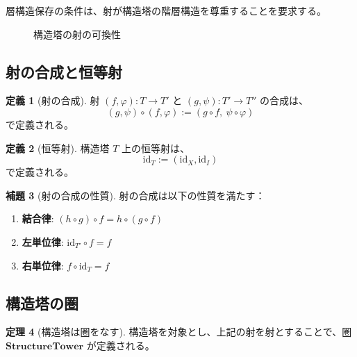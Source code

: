 \documentclass[a4paper,12pt]{ltjsarticle}
\theoremstyle{definition}
\newtheorem{definition}{定義}[section]
\newtheorem{theorem}[definition]{定理}
\newtheorem{lemma}[definition]{補題}
\begin{document}
層構造保存の条件は、射が構造塔の階層構造を尊重することを要求する。

\begin{figure}[h]
\centering
{}
\caption{構造塔の射の可換性}
\label{fig:morphism-commute}
\end{figure}

\subsection{射の合成と恒等射}

\begin{definition}[射の合成]
\label{def:morphism-composition}
射 $(f, \varphi): T \to T'$ と $(g, \psi): T' \to T''$ の合成は、
\[
(g, \psi) \circ (f, \varphi) := (g \circ f,\ \psi \circ \varphi)
\]
で定義される。
\end{definition}

\begin{definition}[恒等射]
構造塔 $T$ 上の恒等射は、
\[
\mathrm{id}_T := (\mathrm{id}_X, \mathrm{id}_I)
\]
で定義される。
\end{definition}

\begin{lemma}[射の合成の性質]
射の合成は以下の性質を満たす：
\begin{enumerate}
\item \textbf{結合律}: $(h \circ g) \circ f = h \circ (g \circ f)$
\item \textbf{左単位律}: $\mathrm{id}_{T'} \circ f = f$
\item \textbf{右単位律}: $f \circ \mathrm{id}_T = f$
\end{enumerate}
\end{lemma}

\subsection{構造塔の圏}

\begin{theorem}[構造塔は圏をなす]
\label{thm:tower-category}
構造塔を対象とし、上記の射を射とすることで、圏 $\mathbf{StructureTower}$ が定義される。
\end{theorem}
\end{document}
